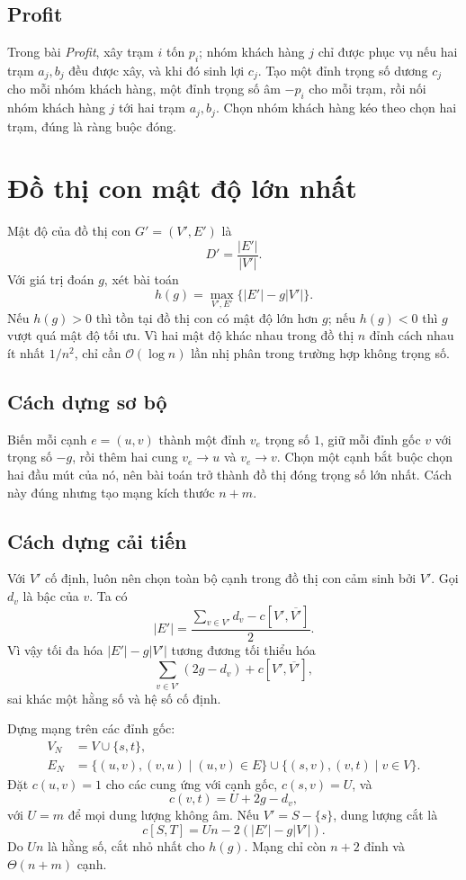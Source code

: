 \documentclass[11pt]{article}
\newcommand{\Oh}{\mathcal{O}}
\begin{document}
\subsection{Profit}

Trong bài \textit{Profit}, xây trạm \(i\) tốn \(p_i\); nhóm khách hàng \(j\)
chỉ được phục vụ nếu hai trạm \(a_j,b_j\) đều được xây, và khi đó sinh lợi
\(c_j\). Tạo một đỉnh trọng số dương \(c_j\) cho mỗi nhóm khách hàng, một đỉnh
trọng số âm \(-p_i\) cho mỗi trạm, rồi nối nhóm khách hàng \(j\) tới hai trạm
\(a_j,b_j\). Chọn nhóm khách hàng kéo theo chọn hai trạm, đúng là ràng buộc
đóng.

\section{Đồ thị con mật độ lớn nhất}

Mật độ của đồ thị con \(G'=(V',E')\) là
\[
  D'=\frac{|E'|}{|V'|}.
\]
Với giá trị đoán \(g\), xét bài toán
\[
  h(g)=\max_{V',E'}\{|E'|-g|V'|\}.
\]
Nếu \(h(g)>0\) thì tồn tại đồ thị con có mật độ lớn hơn \(g\); nếu \(h(g)<0\)
thì \(g\) vượt quá mật độ tối ưu. Vì hai mật độ khác nhau trong đồ thị \(n\)
đỉnh cách nhau ít nhất \(1/n^2\), chỉ cần \(\Oh(\log n)\) lần nhị phân trong
trường hợp không trọng số.

\subsection{Cách dựng sơ bộ}

Biến mỗi cạnh \(e=(u,v)\) thành một đỉnh \(v_e\) trọng số \(1\), giữ mỗi đỉnh
gốc \(v\) với trọng số \(-g\), rồi thêm hai cung \(v_e\to u\) và \(v_e\to v\).
Chọn một cạnh bắt buộc chọn hai đầu mút của nó, nên bài toán trở thành đồ thị
đóng trọng số lớn nhất. Cách này đúng nhưng tạo mạng kích thước \(n+m\).

\subsection{Cách dựng cải tiến}

Với \(V'\) cố định, luôn nên chọn toàn bộ cạnh trong đồ thị con cảm sinh bởi
\(V'\). Gọi \(d_v\) là bậc của \(v\). Ta có
\[
  |E'|=\frac{\sum_{v\in V'}d_v-c[V',\overline{V'}]}2.
\]
Vì vậy tối đa hóa \(|E'|-g|V'|\) tương đương tối thiểu hóa
\[
  \sum_{v\in V'}(2g-d_v)+c[V',\overline{V'}],
\]
sai khác một hằng số và hệ số cố định.

Dựng mạng trên các đỉnh gốc:
\[
\begin{aligned}
V_N&=V\cup\{s,t\},\\
E_N&=\{(u,v),(v,u)\mid (u,v)\in E\}
\cup\{(s,v),(v,t)\mid v\in V\}.
\end{aligned}
\]
Đặt \(c(u,v)=1\) cho các cung ứng với cạnh gốc, \(c(s,v)=U\), và
\[
  c(v,t)=U+2g-d_v,
\]
với \(U=m\) để mọi dung lượng không âm. Nếu \(V'=S-\{s\}\), dung lượng cắt là
\[
  c[S,T]=Un-2(|E'|-g|V'|).
\]
Do \(Un\) là hằng số, cắt nhỏ nhất cho \(h(g)\). Mạng chỉ còn \(n+2\) đỉnh và
\(\Theta(n+m)\) cạnh.
\end{document}
